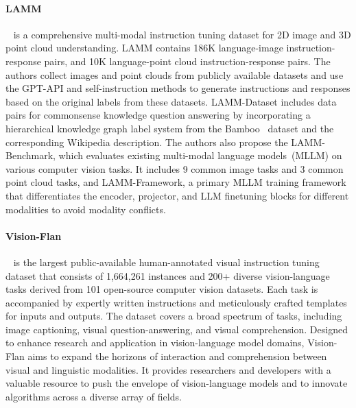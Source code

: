 \documentclass[11pt]{article}
\begin{document}
\paragraph{LAMM}~\citep{Yin2023LAMMLM} is a comprehensive multi-modal instruction tuning dataset for 2D image and 3D point cloud understanding. LAMM contains 186K language-image instruction-response pairs, and 10K language-point cloud instruction-response pairs. The authors collect images and point clouds from publicly available datasets and use the GPT-API and self-instruction methods to generate instructions and responses based on the original labels from these datasets. LAMM-Dataset includes data pairs for commonsense knowledge question answering by incorporating a hierarchical knowledge graph label system from the Bamboo~\citep{zhang2022bamboo} dataset and the corresponding Wikipedia description. The authors also propose the LAMM-Benchmark, which evaluates existing multi-modal language models~(MLLM) on various computer vision tasks. It includes 9 common image tasks and 3 common point cloud tasks, and LAMM-Framework, a primary MLLM training framework that differentiates the encoder, projector, and LLM finetuning blocks for different modalities to avoid modality conflicts. 

\paragraph{Vision-Flan}~\citep{xu2024vision} is the largest public-available human-annotated visual instruction tuning dataset that consists of 1,664,261 instances and 200+ diverse vision-language tasks derived from 101 open-source computer vision datasets. Each task is accompanied by expertly written instructions and meticulously crafted templates for inputs and outputs. The dataset covers a broad spectrum of tasks, including image captioning, visual question-answering, and visual comprehension. Designed to enhance research and application in vision-language model domains, Vision-Flan aims to expand the horizons of interaction and comprehension between visual and linguistic modalities. It provides researchers and developers with a valuable resource to push the envelope of vision-language models and to innovate algorithms across a diverse array of fields.
\end{document}
